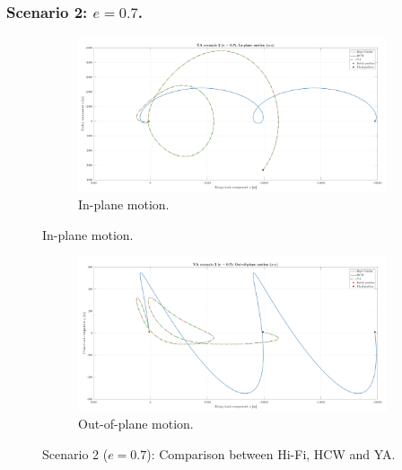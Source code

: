 		\subsubsection{Scenario 2: $e = 0.7$.}
		\begin{figure}[ht]
		\begin{changemargin}{-2.2cm}{-1cm}
		\begin{adjustbox}{width=1.2\textwidth}
		\centering
		\medskip
		\begin{subfigure}[t]{\linewidth}
		\centering\includegraphics[width=\linewidth]{Chapters/Chapter_03/YA_scenario_2_(e___0_7)_IP}
		\caption{In-plane motion.}
		\label{figCh3:Scenario2_IP}
		\end{subfigure}
		\end{adjustbox}
		\end{changemargin}
		\end{figure}
		\begin{figure}
		\begin{changemargin}{-2.2cm}{-1cm}
		\begin{adjustbox}{width=1.2\textwidth}
		\ContinuedFloat
		\centering
		\begin{subfigure}[t]{\linewidth}
		\centering\includegraphics[width=\linewidth]{Chapters/Chapter_03/YA_scenario_2_(e___0_7)_OOP}
		\caption{Out-of-plane motion.}
		\label{figCh3:Scenario2_OOP}
		\end{subfigure}
		\end{adjustbox}
		\end{changemargin}
		\caption{Scenario 2 ($e= 0.7$): Comparison between Hi-Fi, HCW and YA. }
		\label{figCh3:Scenario2}
		\end{figure}
		\FloatBarrier
